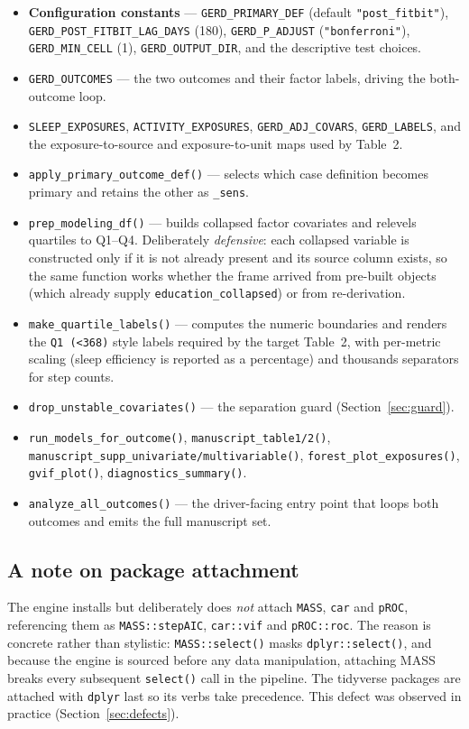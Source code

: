 \documentclass[11pt]{article}
\newcommand{\code}[1]{\texttt{\small #1}}
\begin{document}
\begin{itemize}[leftmargin=1.4em,itemsep=2pt]
  \item \textbf{Configuration constants} --- \code{GERD_PRIMARY_DEF} (default \code{"post_fitbit"}),
  \code{GERD_POST_FITBIT_LAG_DAYS} (180), \code{GERD_P_ADJUST} (\code{"bonferroni"}),
  \code{GERD_MIN_CELL} (1), \code{GERD_OUTPUT_DIR}, and the descriptive test choices.
  \item \code{GERD_OUTCOMES} --- the two outcomes and their factor labels, driving the both-outcome loop.
  \item \code{SLEEP_EXPOSURES}, \code{ACTIVITY_EXPOSURES}, \code{GERD_ADJ_COVARS},
  \code{GERD_LABELS}, and the exposure-to-source and exposure-to-unit maps used by Table~2.
  \item \code{apply_primary_outcome_def()} --- selects which case definition becomes primary and
  retains the other as \code{*_sens}.
  \item \code{prep_modeling_df()} --- builds collapsed factor covariates and relevels quartiles to
  Q1--Q4. Deliberately \emph{defensive}: each collapsed variable is constructed only if it is not
  already present and its source column exists, so the same function works whether the frame arrived
  from pre-built objects (which already supply \code{education_collapsed}) or from re-derivation.
  \item \code{make_quartile_labels()} --- computes the numeric boundaries and renders the
  \code{Q1 (<368)} style labels required by the target Table~2, with per-metric scaling (sleep
  efficiency is reported as a percentage) and thousands separators for step counts.
  \item \code{drop_unstable_covariates()} --- the separation guard (Section~\ref{sec:guard}).
  \item \code{run_models_for_outcome()}, \code{manuscript_table1/2()},
  \code{manuscript_supp_univariate/multivariable()}, \code{forest_plot_exposures()},
  \code{gvif_plot()}, \code{diagnostics_summary()}.
  \item \code{analyze_all_outcomes()} --- the driver-facing entry point that loops both outcomes and
  emits the full manuscript set.
\end{itemize}

\subsection{A note on package attachment}
The engine installs but deliberately does \emph{not} attach \code{MASS}, \code{car} and \code{pROC},
referencing them as \code{MASS::stepAIC}, \code{car::vif} and \code{pROC::roc}. The reason is
concrete rather than stylistic: \code{MASS::select()} masks \code{dplyr::select()}, and because the
engine is sourced before any data manipulation, attaching MASS breaks every subsequent \code{select()}
call in the pipeline. The tidyverse packages are attached with \code{dplyr} last so its verbs take
precedence. This defect was observed in practice (Section~\ref{sec:defects}).
\end{document}
